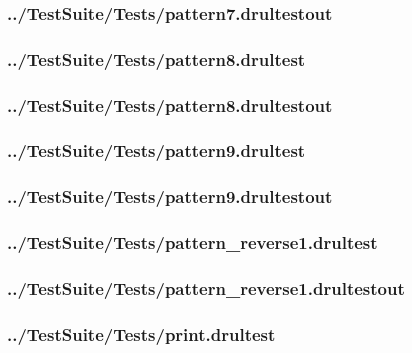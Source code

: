 \begin{changemargin}{-1in}{-1in}
\subsubsection{../TestSuite/Tests/pattern7.drultestout}


\subsubsection{../TestSuite/Tests/pattern8.drultest}


\subsubsection{../TestSuite/Tests/pattern8.drultestout}


\subsubsection{../TestSuite/Tests/pattern9.drultest}


\subsubsection{../TestSuite/Tests/pattern9.drultestout}


\subsubsection{../TestSuite/Tests/pattern\_reverse1.drultest}


\subsubsection{../TestSuite/Tests/pattern\_reverse1.drultestout}


\subsubsection{../TestSuite/Tests/print.drultest}



\end{changemargin}

